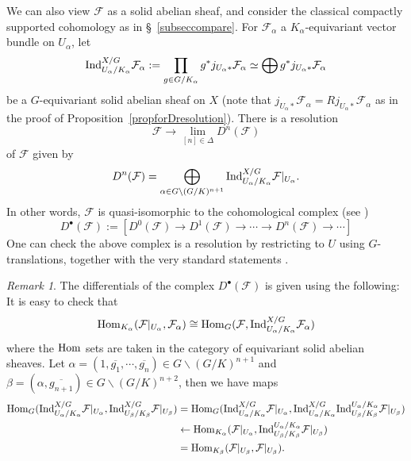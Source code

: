 \documentclass[a4paper,10pt]{amsart}
\theoremstyle{remark}
\newtheorem{remark}[theorem]{Remark}
\theoremstyle{definition}
\theoremstyle{plain}
\numberwithin{equation}{section}
\newcommand{\calF}{{\mathcal F}}
\newcommand{\Hom}{{\rm Hom}}
\newcommand{\Ind}{{\rm Ind}}
\begin{document}
 
We can also view $\calF$ as a solid abelian sheaf, and consider the classical compactly supported cohomology as in \S~\ref{subseccompare}. For $\calF_{\alpha}$ a $K_\alpha$-equivariant vector bundle on $U_\alpha$, let
$$\Ind_{U_{\alpha}/K_{\alpha}}^{X/G}\calF_{\alpha}:= \prod_{g\in G/K_{\alpha}} g^*j_{U_{\alpha}*}\calF_{\alpha}\simeq \bigoplus  g^*j_{U_{\alpha}*}\calF_{\alpha}$$
be a $G$-equivariant solid abelian sheaf on $X$ (note that $j_{U_{\alpha}*}\calF_{\alpha}=Rj_{U_{\alpha}*}\calF_{\alpha}$ as in the proof of Proposition~\ref{propforDresolution}). There is a resolution 
\begin{equation}\label{equationresolutionsheafD}
	\calF\to\lim_{[n]\in \Delta}D^n(\calF)	
\end{equation}
of $\calF$ given by 
\[D^n(\calF)=\bigoplus_{\alpha \in G\backslash (G/K)^{n+1}} \Ind^{X/G}_{U_{\alpha}/K_{\alpha}} \calF|_{U_\alpha}.\] In other words, $\calF$ is quasi-isomorphic to the cohomological complex (see \cite[Thm.~8.3.8]{weibel1994introduction})
\begin{equation}\label{equationresolutionsheafDcomplex}
	D^{\bullet}(\calF):=[D^0(\calF)\rightarrow D^1(\calF)\rightarrow \cdots\to D^n(\calF)\to\cdots]
\end{equation} 
One can check the above complex is a resolution by restricting to $U$ using $G$-translations, together with the very standard statements \cite[\href{https://stacks.math.columbia.edu/tag/02FU}{Tag 02FU}]{stacks-project}. 
\begin{remark}
 	The differentials of the complex $D^{\bullet}(\calF)$ is given using the following: It is easy to check that 
	$$\Hom_{K_\alpha}(\calF|_{U_\alpha},\calF_{\alpha})\cong \Hom_G(\calF,\Ind_{U_{\alpha}/K_{\alpha}}^{X/G}\calF_{\alpha})$$ 
	where the $\Hom$ sets are taken in the category of equivariant solid abelian sheaves. Let $\alpha=(1,\overline{g_1},\cdots,\overline{g_{n}})\in G\backslash(G/K)^{n+1}$ and $\beta=(\alpha,\overline{g_{n+1}})\in G\backslash(G/K)^{n+2}$, then we have maps
 	 $$\begin{aligned}
 	 \Hom_G(\Ind_{U_\alpha/K_\alpha}^{X/G}\calF|_{U_\alpha},\Ind_{U_{\beta}/K_{\beta}}^{X/G} \calF|_{U_{\beta}})& =\Hom_{G}(\Ind_{U_\alpha/K_\alpha}^{X/G}\calF|_{U_\alpha},\Ind_{U_\alpha/K_\alpha}^{X/G}\Ind_{U_{\beta}/K_{\beta}}^{U_\alpha/K_\alpha} \calF|_{U_{\beta}})\\
 	 &\leftarrow \Hom_{K_\alpha}(\calF|_{U_\alpha},\Ind_{U_{\beta}/K_{\beta}}^{U_\alpha/K_\alpha} \calF|_{U_{\beta}})\\
 	 &=\Hom_{K_\beta}(\calF|_{U_\beta},\calF|_{U_\beta}).
 	 \end{aligned}$$
 \end{remark} 
 
\end{document}
